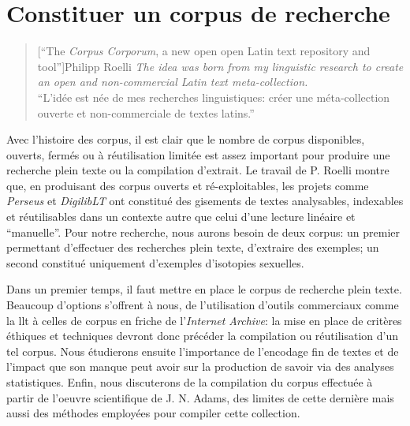 


\section{Constituer un corpus de recherche}


\begin{quote}[\enquote{The \textit{Corpus Corporum}, a new open open Latin text repository and tool}]{Philipp Roelli}
    \textit{The idea was born from my linguistic research to create an open and non-commercial Latin text meta-collection.} \\
    \enquote{L'idée est née de mes recherches linguistiques: créer une méta-collection ouverte et non-commerciale de textes latins.}
\end{quote}

Avec l'histoire des corpus, il est clair que le nombre de corpus disponibles, ouverts, fermés ou à réutilisation limitée est assez important pour produire une recherche plein texte ou la compilation d'extrait. Le travail de P. Roelli montre que, en produisant des corpus ouverts et ré-exploitables, les projets comme \textit{Perseus} et \textit{DigilibLT} ont constitué des gisements de textes analysables, indexables et réutilisables dans un contexte autre que celui d'une lecture linéaire et ``manuelle''. Pour notre recherche, nous aurons besoin de deux corpus: un premier permettant d'effectuer des recherches plein texte, d'extraire des exemples; un second constitué uniquement d'exemples d'isotopies sexuelles.

Dans un premier temps, il faut mettre en place le corpus de recherche plein texte. Beaucoup d'options s'offrent à nous, de l'utilisation d'outils commerciaux comme la \acrshort{llt} à celles de corpus en friche de l'\textit{Internet Archive}: la mise en place de critères éthiques et techniques devront donc précéder la compilation ou réutilisation d'un tel corpus. Nous étudierons ensuite l'importance de l'encodage fin de textes et de l'impact que son manque peut avoir sur la production de savoir via des analyses statistiques. Enfin, nous discuterons de la compilation du corpus effectuée à partir de l'oeuvre scientifique de J. N. Adams, des limites de cette dernière mais aussi des méthodes employées pour compiler cette collection.

